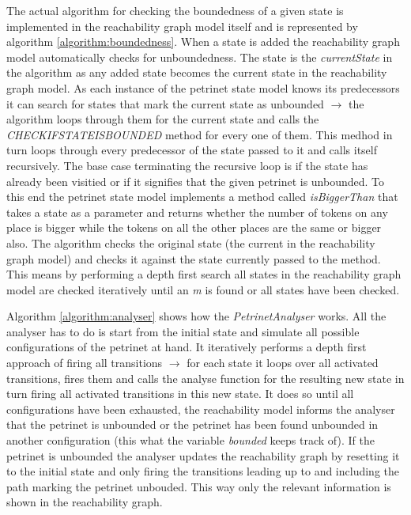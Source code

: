 \documentclass[10pt, a4paper]{article}
\begin{document}


The actual algorithm for checking the boundedness of a given state is implemented in the reachability graph model itself and is represented by algorithm \ref{algorithm:boundedness}. When a state is added the reachability graph model automatically checks for unboundedness. The state is the \textit{currentState} in the algorithm as any added state becomes the current state in the reachability graph model. As each instance of the petrinet state model knows its predecessors it can search for states that mark the current state as unbounded $\rightarrow$ the algorithm loops through them for the current state and calls the \textit{CHECKIFSTATEISBOUNDED} method for every one of them. This medhod in turn loops through every predecessor of the state passed to it and calls itself recursively. The base case terminating the recursive loop is if the state has already been visitied or if it signifies that the given petrinet is unbounded. To this end the petrinet state model implements a method called \textit{isBiggerThan} that takes a state as a parameter and returns whether the number of tokens on any place is bigger while the tokens on all the other places are the same or bigger also. The algorithm checks the original state (the current in the reachability graph model) and checks it against the state currently passed to the method. This means by performing a depth first search all states in the reachability graph model are checked iteratively until an \textit{m} is found or all states have been checked.




Algorithm \ref{algorithm:analyser} shows how the \textit{PetrinetAnalyser} works. All the analyser has to do is start from the initial state and simulate all possible configurations of the petrinet at hand. It iteratively performs a depth first approach of firing all transitions $\rightarrow$ for each state it loops over all activated transitions, fires them and calls the analyse function for the resulting new state in turn firing all activated transitions in this new state. It does so until all configurations have been exhausted, the reachability model informs the analyser that the petrinet is unbounded or the petrinet has been found unbounded in another configuration (this what the variable \textit{bounded} keeps track of). If the petrinet is unbounded the analyser updates the reachability graph by resetting it to the initial state and only firing the transitions leading up to and including the path marking the petrinet unbouded. This way only the relevant information is shown in the reachability graph.
\end{document}
